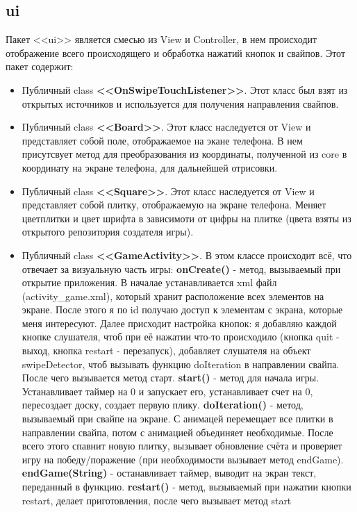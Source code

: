 \subsection{ui}
Пакет <<ui>> является смесью из View и Controller, в нем происходит отображение всего происходящего и обработка нажатий кнопок и свайпов. Этот пакет содержит:
\begin{itemize}
\item Публичный class \textbf{<<OnSwipeTouchListener>>}. Этот класс был взят из открытых источников и используется для получения направления свайпов.
\item Публичный class \textbf{<<Board>>}. Этот класс наследуется от View и представляет собой поле, отображаемое на экане телефона. В нем присутсвует метод для преобразования из координаты, полученной из core в координату на экране телефона, для дальнейшей отрисовки.
\item Публичный class \textbf{<<Square>>}. Этот класс наследуется от View и представляет собой плитку, отображаемую на экране телефона. Меняет цветплитки и цвет шрифта в зависимоти от цифры на плитке (цвета взяты из открытого репозитория создателя игры).
\item Публичный class \textbf{<<GameActivity>>}. В этом классе происходит всё, что отвечает за визуальную часть игры:
\subitem \textbf{onCreate()} - метод, вызываемый при открытие приложения. В началае устанавливается xml файл (activity\_game.xml), который хранит расположение всех элементов на экране. После этого я по id получаю доступ к элементам с экрана, которые меня интересуют. Далее присходит настройка кнопок: я добавляю каждой кнопке слушателя, чтоб при её нажатии что-то происходило (кнопка quit - выход, кнопка restart - перезапуск), добавляет слушателя на объект swipeDetector, чтоб вызывать функцию doIteration в направлении свайпа. После чего вызывается метод старт.
\subitem \textbf{start()} - метод для начала игры. Устанавливает таймер на 0 и запускает его, устанавливает счет на 0, пересоздает доску, создает первую плику.
\subitem \textbf{doIteration()} - метод, вызываемый при свайпе на экране. С анимацей перемещает все плитки в направлении свайпа, потом с анимацией объединяет необходимые. После всего этого спавнит новую плитку, вызывает обновление счёта и проверяет игру на победу/поражение (при необходимости вызывает метод endGame).
\subitem \textbf{endGame(String)} - останавливает таймер, выводит на экран текст, переданный в функцию.
\subitem \textbf{restart()} - метод, вызываемый при нажатии кнопки restart, делает приготовления, после чего вызывает метод start
\end{itemize}

